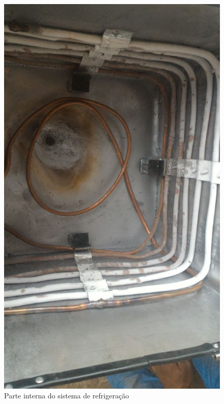 \begin{figure}[H]
\centering
\includegraphics[width=16cm]{figuras/refrigeracaoint.png}
\caption{Parte interna do sistema de refrigeração}
\end{figure}

